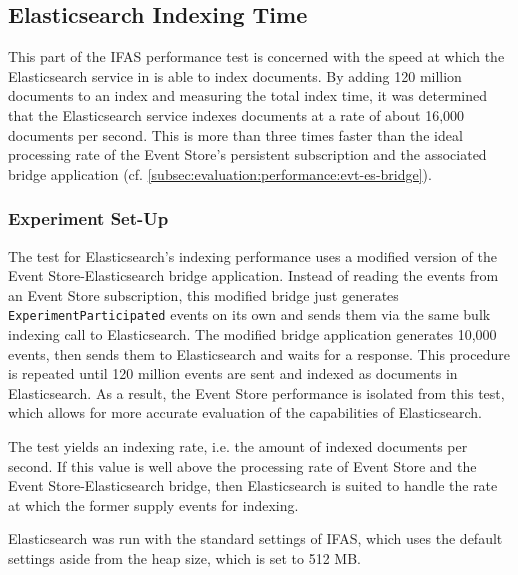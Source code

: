\subsection{Elasticsearch Indexing Time}
\label{subsec:evaluation:performance:elasticsearch}

This part of the \ac{IFAS} performance test is concerned with the speed at which the Elasticsearch service in is able to index documents.
By adding 120 million documents to an index and measuring the total index time, it was determined that the Elasticsearch service indexes documents at a rate of about 16,000 documents per second.
This is more than three times faster than the ideal processing rate of the Event Store's persistent subscription and the associated bridge application (cf. \cref{subsec:evaluation:performance:evt-es-bridge}).

\subsubsection{Experiment Set-Up}

The test for Elasticsearch's indexing performance uses a modified version of the Event Store-Elasticsearch bridge application.
Instead of reading the events from an Event Store subscription, this modified bridge just generates \texttt{ExperimentParticipated} events on its own and sends them via the same bulk indexing call to Elasticsearch.
The modified bridge application generates 10,000 events, then sends them to Elasticsearch and waits for a response.
This procedure is repeated until 120 million events are sent and indexed as documents in Elasticsearch.
As a result, the Event Store performance is isolated from this test, which allows for more accurate evaluation of the capabilities of Elasticsearch.

The test yields an indexing rate, i.e. the amount of indexed documents per second.
If this value is well above the processing rate of Event Store and the Event Store-Elasticsearch bridge, then Elasticsearch is suited to handle the rate at which the former supply events for indexing.

Elasticsearch was run with the standard settings of \ac{IFAS}, which uses the default settings aside from the heap size, which is set to 512 MB.


